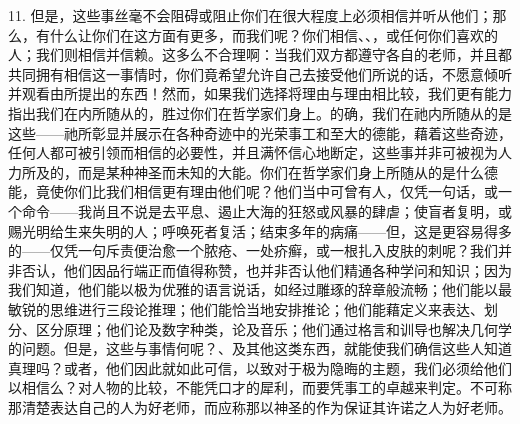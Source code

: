 11. 但是，这些事丝毫不会阻碍或阻止你们在很大程度上必须相信并听从他们；那么，有什么让你们在这方面有更多，而我们呢？你们相信、、，或任何你们喜欢的人；我们则相信并信赖。这多么不合理啊：当我们双方都遵守各自的老师，并且都共同拥有相信这一事情时，你们竟希望允许自己去接受他们所说的话，不愿意倾听并观看由所提出的东西！然而，如果我们选择将理由与理由相比较，我们更有能力指出我们在内所随从的，胜过你们在哲学家们身上。的确，我们在祂内所随从的是这些——祂所彰显并展示在各种奇迹中的光荣事工和至大的德能，藉着这些奇迹，任何人都可被引领而相信的必要性，并且满怀信心地断定，这些事并非可被视为人力所及的，而是某种神圣而未知的大能。你们在哲学家们身上所随从的是什么德能，竟使你们比我们相信更有理由他们呢？他们当中可曾有人，仅凭一句话，或一个命令——我尚且不说是去平息、遏止大海的狂怒或风暴的肆虐；使盲者复明，或赐光明给生来失明的人；呼唤死者复活；结束多年的病痛——但，这是更容易得多的——仅凭一句斥责便治愈一个脓疮、一处疥癣，或一根扎入皮肤的刺呢？我们并非否认，他们因品行端正而值得称赞，也并非否认他们精通各种学问和知识；因为我们知道，他们能以极为优雅的语言说话，如经过雕琢的辞章般流畅；他们能以最敏锐的思维进行三段论推理；他们能恰当地安排推论；他们能藉定义来表达、划分、区分原理；他们论及数字种类，论及音乐；他们通过格言和训导也解决几何学的问题。但是，这些与事情何呢？、及其他这类东西，就能使我们确信这些人知道真理吗？或者，他们因此就如此可信，以致对于极为隐晦的主题，我们必须给他们以相信么？对人物的比较，不能凭口才的犀利，而要凭事工的卓越来判定。不可称那清楚表达自己的人为好老师，而应称那以神圣的作为保证其许诺之人为好老师。\par

